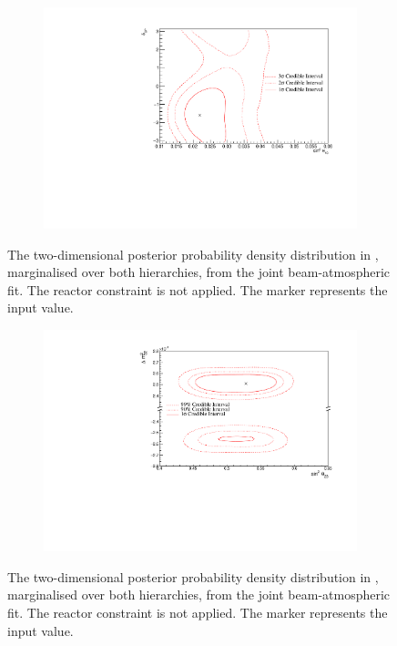 \begin{figure}[h]
  \begin{subfigure}[t]{0.96\textwidth}
    \includegraphics[width=\textwidth, trim={0mm 0mm 0mm 0mm}, clip,page=1]{Figures/OA/JointFit/Contours_2D_th13_dcp_BH_1_woRC_UnSmeared_CredibleInterval.pdf}
  \end{subfigure}
  \caption{The two-dimensional posterior probability density distribution in , marginalised over both hierarchies, from the joint beam-atmospheric fit. The reactor constraint is not applied. The marker represents the input value.}
  \label{fig:OscillationAnalysis_JointFit_DCPTH13}
\end{figure}

\begin{figure}[h]
  \begin{subfigure}[t]{0.96\textwidth}
    \includegraphics[width=\textwidth, trim={0mm 0mm 0mm 0mm}, clip,page=1]{Figures/OA/JointFit/Contours_2D_th23_dm32_BH_0_woRC_UnSmeared_CredibleInterval.pdf}
  \end{subfigure}
  \caption{The two-dimensional posterior probability density distribution in , marginalised over both hierarchies, from the joint beam-atmospheric fit. The reactor constraint is not applied. The marker represents the input value.}
  \label{fig:OscillationAnalysis_JointFit_DM32TH23}
\end{figure}

